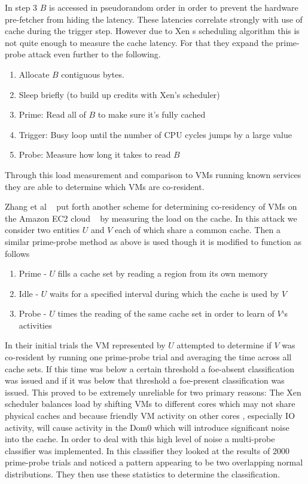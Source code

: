 In step 3 $B$ is accessed in pseudorandom order in order to prevent the hardware pre-fetcher from hiding the latency. These latencies correlate strongly with use of cache during the trigger step. However due to Xen s scheduling algorithm this is not quite enough to measure the cache latency. For that they expand the prime-probe attack even further to the following.

\begin{enumerate}
	\item Allocate $B$ contiguous bytes.
	\item Sleep briefly (to build up credits with Xen's scheduler)
	\item Prime: Read all of $B$ to make sure it's fully cached
	\item Trigger: Busy loop until the number of CPU cycles jumps by a large value
	\item Probe: Measure how long it takes to read $B$
\end{enumerate}

Through this load measurement and comparison to VMs running known services they are able to determine which VMs are co-resident. 

Zhang et al ~\cite{zhang_cross-vm_2012} put forth another scheme for determining co-residency of VMs on the Amazon EC2 cloud ~\cite{_aws_EC2_2014} by measuring the load on the cache. In this attack we consider two entities $U$ and $V$ each of which share a common cache. Then a similar prime-probe method as above is used though it is modified to function as follows

\begin{enumerate}
	\item Prime - $U$ fills a cache set by reading a region from its own memory
	\item Idle - $U$ waits for a specified interval during which the cache is used by $V$
	\item Probe - $U$ times the reading of the same cache set in order to learn of $V$`s activities
\end{enumerate}


In their initial trials the VM represented by $U$ attempted to determine if $V$ was co-resident by running one prime-probe trial and averaging the time across all cache sets. If this time was below a certain threshold a foe-absent classification was issued and if it was below that threshold a foe-present classification was issued. This proved to be extremely unreliable for two primary reasons: The Xen scheduler balances load by shifting VMs to different cores which may not share physical caches and because friendly VM activity on other cores , especially IO activity, will cause activity in the Dom0 which will introduce significant noise into the cache. In order to deal with this high level of noise a multi-probe classifier was implemented. In this classifier they looked at the results of 2000 prime-probe trials and noticed a pattern appearing to be two overlapping normal distributions. They then use these statistics to determine the classification. 

